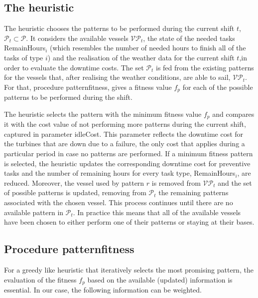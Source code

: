 \subsection{The heuristic}
\label{subsec:heuristic}
The heuristic chooses the patterns to be performed during the current shift $t$, $\mathcal{P}_t\subset \mathcal{P}$. It considers the available vessels $\mathcal{VP}_t$, the state of the needed tasks RemainHours$_i$ (which resembles the number of needed hours to finish all of the tasks of type $i$) and the realisation of the weather data for the current shift $t$,in order to evaluate the downtime costs. The set $\mathcal{P}_t$ is fed from the existing patterns for the vessels that, after realising the weather conditions, are able to sail, $\mathcal{VP}_t$. For that, procedure patternfitness, gives a fitness value $f_p$ for each of the possible patterns to be performed during the shift.%

The heuristic selects the pattern with the minimum fitness value $f_p$ and compares it with the cost value of not performing more patterns during the current shift, captured in parameter idleCost. This parameter reflects the downtime cost for the turbines that are down due to a failure, the only cost that applies during a particular period in case no patterns are performed. If a minimum fitness pattern is selected, the heuristic updates the corresponding downtime cost for preventive tasks and the number of remaining hours for every task type, RemainHours$_i$, are reduced. %
Moreover, the vessel used by pattern $r$ is removed from $\mathcal{VP}_t$ and the set of possible patterns is updated, removing from $\mathcal{P}_t$ the remaining patterns associated with the chosen vessel. This process continues until there are no available pattern in $\mathcal{P}_t$. In practice this means that all of the available vessels have been chosen to either perform one of their patterns or staying at their bases.%

\subsection{Procedure patternfitness}
For a greedy like heuristic that iteratively selects the most promising pattern, the evaluation of the fitness $f_p$ based on the available (updated) information is essential. In our case, the following information can be weighted. 

